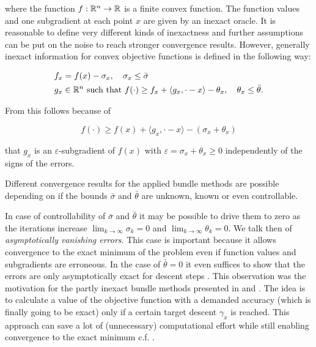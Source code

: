 where the function \(f:\mathbb{R}^n \to \mathbb{R}\) is a finite convex function. The function values and one subgradient at each point \(x\) are given by an inexact oracle.
It is reasonable to define very different kinds of inexactness and further assumptions can be put on the noise to reach stronger convergence results. However, generally inexact information for convex objective functions is defined in the following way:

\begin{align}
	&f_x = f(x)-\sigma_x, \quad \sigma_x \leq \bar{\sigma} \label{conv_inexactness_1}\\
	&g_x \in \mathbb{R}^n \text{ such that } f(\cdot) \geq f_x + \langle g_x, \cdot - x \rangle - \theta_x, \quad \theta_x \leq \bar{\theta}.
	\label{conv_inexactness_2}
\end{align}

From this follows because of

\begin{equation}
	f(\cdot) \geq f(x)+\langle g_x, \cdot - x \rangle - (\sigma_x+\theta_x)
	\label{sig_p_thet_subgr}
\end{equation}

that \(g_x\) is an \(\varepsilon\)-subgradient of \(f(x)\) with \(\varepsilon = \sigma_x+\theta_x \geq 0\) independently of the signs of the errors.

Different convergence results for the applied bundle methods are possible depending on if the bounds \(\bar{\sigma}\) and \(\bar{\theta}\) are unknown, known or even controllable.

In case of controllability of \(\bar{\sigma}\) and \(\bar{\theta}\) it may be possible to drive them to zero  as the iterations increase \(\lim_{k \to \infty} \sigma_k = 0\) and \(\lim_{k \to \infty} \theta_k =  0\). We talk then of \emph{asymptotically vanishing errors}. 
This case is important because it allows convergence to the exact minimum of the problem even if function values and subgradients are erroneous. In the case of \(\bar{\theta} = 0\) it even suffices to show that the errors are only asymptotically exact for descent steps \cite{Kiwiel2010}.
This observation was the motivation for the partly inexact bundle methods presented in \cite{Kiwiel2010} and \cite{Oliveira2014}.
The idea is to calculate a value of the objective function with a demanded accuracy (which is finally going to be exact) only if a certain target descent \(\gamma_x\) is reached. This approach can save a lot of (unnecessary) computational effort while still enabling convergence to the exact minimum c.f. \cite{Oliveira2014}.

